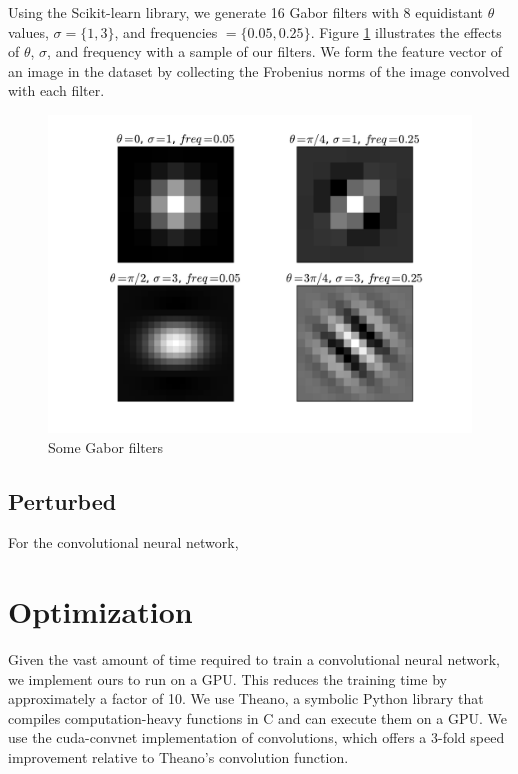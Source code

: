 \documentclass{acm_proc_article-sp}
\begin{document}
Using the Scikit-learn library\cite{scikit-learn}, we generate 16 Gabor filters with 8 equidistant $\theta$ values, $\sigma = \{1, 3\}$, and frequencies $= \{0.05, 0.25\}$. Figure \ref{fig:gabor} illustrates the effects of $\theta$, $\sigma$, and frequency with a sample of our filters. We form the feature vector of an image in the dataset by collecting the Frobenius norms of the image convolved with each filter. 

\begin{figure}[h]
	\centering
	\includegraphics[width=\linewidth]{gabors}
  	\caption{Some Gabor filters}
  	\label{fig:gabor}
\end{figure}

\subsection{Perturbed}
For the convolutional neural network, 


\section{Optimization} 
Given the vast amount of time required to train a convolutional neural network, we implement ours to run on a GPU. This reduces the training time by approximately a factor of 10. We use Theano\cite{Theano}, a symbolic Python library that compiles computation-heavy functions in C and can execute them on a GPU. We use the cuda-convnet implementation of convolutions\cite{Krizhevsky}, which offers a 3-fold speed improvement relative to Theano's convolution function.
\end{document}
